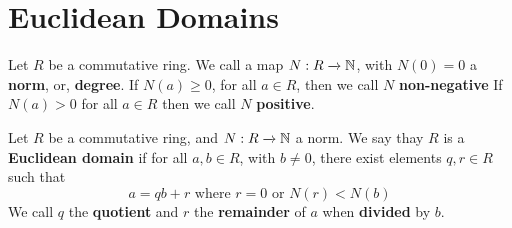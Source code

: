 \section{Euclidean Domains}
\label{section_6.1}

\begin{definition}
  Let $R$ be a commutative ring. We call a map  $N:R \xrightarrow{} \mathbb{N}$, with
  $N(0)=0$ a \textbf{norm}, or, \textbf{degree}. If $N(a) \geq 0$, for all $a
  \in R$, then we call $N$ \textbf{non-negative} If $N(a)>0$ for all $a \in R$
  then we call  $N$ \textbf{positive}.
\end{definition}

\begin{definition}
  Let $R$ be a commutative ring, and  $N:R \xrightarrow{} \mathbb{N}$ a norm. We say
  thay $R$ is a \textbf{Euclidean domain} if for all $a,b \in R$, with $b \neq
  0$, there exist elements  $q,r \in R$ such that
  \begin{equation*}
    a=qb+r \text{ where } r=0 \text{ or } N(r)<N(b)
  \end{equation*}
  We call $q$ the  \textbf{quotient} and $r$ the  \textbf{remainder} of $a$
  when  \textbf{divided} by $b$.
\end{definition}

